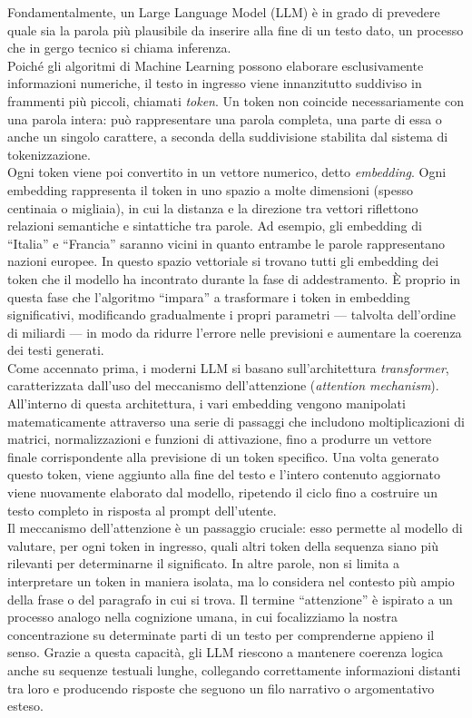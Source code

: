 Fondamentalmente, un Large Language Model (LLM) è in grado di prevedere quale sia la parola più plausibile da inserire alla fine di un testo dato, un processo che in gergo tecnico si chiama inferenza. \\
Poiché gli algoritmi di Machine Learning possono elaborare esclusivamente informazioni numeriche, il testo in ingresso viene innanzitutto suddiviso in frammenti più piccoli, chiamati \textit{token}. Un token non coincide necessariamente con una parola intera: può rappresentare una parola completa, una parte di essa o anche un singolo carattere, a seconda della suddivisione stabilita dal sistema di tokenizzazione. \\
Ogni token viene poi convertito in un vettore numerico, detto \textit{embedding}. Ogni embedding rappresenta il token in uno spazio a molte dimensioni (spesso centinaia o migliaia), in cui la distanza e la direzione tra vettori riflettono relazioni semantiche e sintattiche tra parole. Ad esempio, gli embedding di “Italia” e “Francia” saranno vicini in quanto entrambe le parole rappresentano nazioni europee. In questo spazio vettoriale si trovano tutti gli embedding dei token che il modello ha incontrato durante la fase di addestramento. È proprio in questa fase che l'algoritmo “impara” a trasformare i token in embedding significativi, modificando gradualmente i propri parametri — talvolta dell'ordine di miliardi — in modo da ridurre l’errore nelle previsioni e aumentare la coerenza dei testi generati. \\
Come accennato prima, i moderni LLM si basano sull'architettura \textit{transformer}, caratterizzata dall'uso del meccanismo dell'attenzione (\textit{attention mechanism}). All'interno di questa architettura, i vari embedding vengono manipolati matematicamente attraverso una serie di passaggi che includono moltiplicazioni di matrici, normalizzazioni e funzioni di attivazione, fino a produrre un vettore finale corrispondente alla previsione di un token specifico. Una volta generato questo token, viene aggiunto alla fine del testo e l'intero contenuto aggiornato viene nuovamente elaborato dal modello, ripetendo il ciclo fino a costruire un testo completo in risposta al prompt dell'utente. \\
Il meccanismo dell'attenzione è un passaggio cruciale: esso permette al modello di valutare, per ogni token in ingresso, quali altri token della sequenza siano più rilevanti per determinarne il significato. In altre parole, non si limita a interpretare un token in maniera isolata, ma lo considera nel contesto più ampio della frase o del paragrafo in cui si trova. Il termine “attenzione” è ispirato a un processo analogo nella cognizione umana, in cui focalizziamo la nostra concentrazione su determinate parti di un testo per comprenderne appieno il senso. Grazie a questa capacità, gli LLM riescono a mantenere coerenza logica anche su sequenze testuali lunghe, collegando correttamente informazioni distanti tra loro e producendo risposte che seguono un filo narrativo o argomentativo esteso. \\
